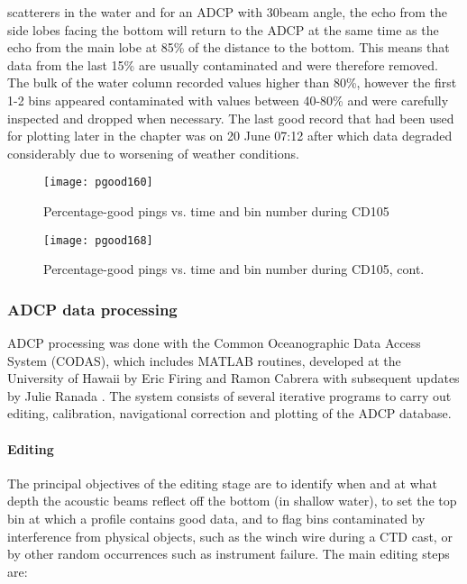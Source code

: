 scatterers in the water and for an ADCP with 30\deg beam angle,
the echo from the side lobes facing the bottom will return to the
ADCP at the same time as the echo from the main lobe at 85\% of
the distance to the bottom. This means that data from the last
15\% are usually contaminated and were therefore removed. The bulk
of the water column recorded values higher than 80\%, however the
first 1-2 bins appeared contaminated with values between 40-80\%
and were carefully inspected and dropped when necessary. The last
good record that had been used for plotting later in the chapter
was on 20 June 07:12 after which data degraded considerably due to
worsening of weather conditions.
\begin{figure}
  \centering
  \texttt{[image: pgood160]}
  \caption{Percentage-good pings vs. time and bin number during CD105}
  \addtocounter{figure}{-1}
  \texttt{[image: pgood168]}
  \caption{Percentage-good pings vs. time and bin number during CD105, cont.}
  \label{fig:cd105pg}
\end{figure}

\subsubsection{ADCP data processing}
ADCP processing was done with the Common Oceanographic Data Access
System (CODAS), which includes MATLAB routines, developed at the
University of Hawaii by Eric Firing and Ramon Cabrera with
subsequent updates by Julie Ranada \citep{codas}. The system
consists of several iterative programs to carry out editing,
calibration, navigational correction and plotting of the ADCP
database.
%
\paragraph{Editing}
The principal objectives of the editing stage are to identify when
and at what depth the acoustic beams reflect off the bottom (in
shallow water), to set the top bin at which a profile contains
good data, and to flag bins contaminated by interference from
physical objects, such as the winch wire during a CTD cast, or by
other random occurrences such as instrument failure. The main
editing steps are:

